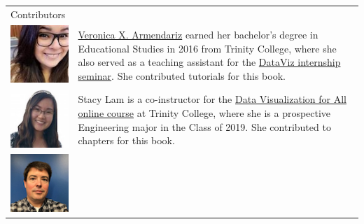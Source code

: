 \documentclass[
  english,
]{book}
\begin{document}
\begin{longtable}[]{@{}ll@{}}
\begin{minipage}[t]{0.50\columnwidth}\raggedright
Contributors\strut
\end{minipage} & \begin{minipage}[t]{0.44\columnwidth}\raggedright
\strut
\end{minipage}\tabularnewline
\begin{minipage}[t]{0.50\columnwidth}\raggedright
\includegraphics{images/0-introduction/ArmendarizVeronica-96.jpg}\strut
\end{minipage} & \begin{minipage}[t]{0.44\columnwidth}\raggedright
\href{https://www.linkedin.com/in/veronica-armendariz-4b814899}{Veronica X. Armendariz} earned her bachelor's degree in Educational Studies in 2016 from Trinity College, where she also served as a teaching assistant for the \href{http://commons.trincoll.edu/dataviz}{DataViz internship seminar}. She contributed tutorials for this book.\strut
\end{minipage}\tabularnewline
\begin{minipage}[t]{0.50\columnwidth}\raggedright
\includegraphics{images/0-introduction/LamStacy-96.jpg}\strut
\end{minipage} & \begin{minipage}[t]{0.44\columnwidth}\raggedright
Stacy Lam is a co-instructor for the \href{http://www.datavizforall.org/enroll}{Data Visualization for All online course} at Trinity College, where she is a prospective Engineering major in the Class of 2019. She contributed to chapters for this book.\strut
\end{minipage}\tabularnewline
\begin{minipage}[t]{0.50\columnwidth}\raggedright
\includegraphics{images/0-introduction/TatemDavid-96.jpg}\strut

\end{minipage}
\end{longtable}
\end{document}
